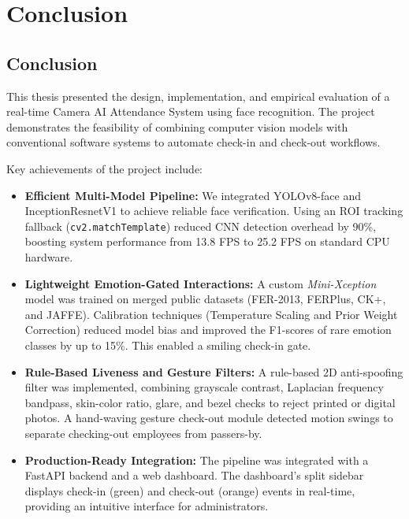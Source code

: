 \chapter{Conclusion}

\section{Conclusion}
This thesis presented the design, implementation, and empirical evaluation of a real-time Camera AI Attendance System using face recognition. The project demonstrates the feasibility of combining computer vision models with conventional software systems to automate check-in and check-out workflows.

Key achievements of the project include:
\begin{itemize}
    \item \textbf{Efficient Multi-Model Pipeline:} We integrated YOLOv8-face and InceptionResnetV1 to achieve reliable face verification. Using an ROI tracking fallback (\texttt{cv2.matchTemplate}) reduced CNN detection overhead by 90\%, boosting system performance from 13.8 FPS to 25.2 FPS on standard CPU hardware.
    \item \textbf{Lightweight Emotion-Gated Interactions:} A custom \textit{Mini-Xception} model was trained on merged public datasets (FER-2013, FERPlus, CK+, and JAFFE). Calibration techniques (Temperature Scaling and Prior Weight Correction) reduced model bias and improved the F1-scores of rare emotion classes by up to 15\%. This enabled a smiling check-in gate.
    \item \textbf{Rule-Based Liveness and Gesture Filters:} A rule-based 2D anti-spoofing filter was implemented, combining grayscale contrast, Laplacian frequency bandpass, skin-color ratio, glare, and bezel checks to reject printed or digital photos. A hand-waving gesture check-out module detected motion swings to separate checking-out employees from passers-by.
    \item \textbf{Production-Ready Integration:} The pipeline was integrated with a FastAPI backend and a web dashboard. The dashboard's split sidebar displays check-in (green) and check-out (orange) events in real-time, providing an intuitive interface for administrators.
\end{itemize}

